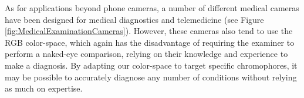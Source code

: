 As for applications beyond phone cameras, a number of different medical cameras have been designed for medical diagnostics and telemedicine (see Figure \ref{fig:MedicalExaminationCameras}). However, these cameras also tend to use the RGB color-space, which again has the disadvantage of requiring the examiner to perform a naked-eye comparison, relying on their knowledge and experience to make a diagnosis. By adapting our color-space to target specific chromophores, it may be possible to accurately diagnose any number of conditions without relying as much on expertise. 


%
%
